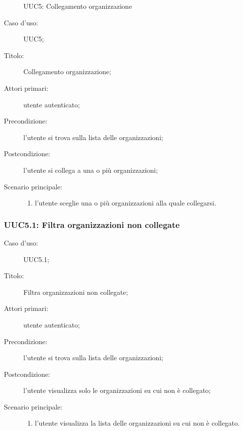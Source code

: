 \documentclass[../../../analisi-dei-requisiti.tex]{subfiles}
\begin{document}
\begin{figure}[H]
  \centering
  \caption{UUC5: Collegamento organizzazione}%
  \label{fig:uuc5}
\end{figure}

\begin{description}
  \item[Caso d’uso:] UUC5;
  \item[Titolo:] Collegamento organizzazione;
  \item[Attori primari:] utente autenticato;
  \item[Precondizione:] l'utente si trova sulla lista delle organizzazioni;
  \item[Postcondizione:] l'utente si collega a una o più organizzazioni;
  \item[Scenario principale:]
        \begin{enumerate}
          \item l'utente sceglie una o più organizzazioni alla quale collegarsi.
        \end{enumerate}
\end{description}


\subsubsection{UUC5.1: Filtra organizzazioni non collegate}%
\begin{description}
  \item[Caso d’uso:] UUC5.1;
  \item[Titolo:] Filtra organizzazioni non collegate;
  \item[Attori primari:] utente autenticato;
  \item[Precondizione:] l'utente si trova sulla lista delle organizzazioni;
  \item[Postcondizione:] l'utente visualizza solo le organizzazioni su cui non è collegato;
  \item[Scenario principale:]
        \begin{enumerate}
          \item l'utente visualizza la lista delle organizzazioni su cui non è collegato.
        \end{enumerate}
\end{description}
\end{document}
